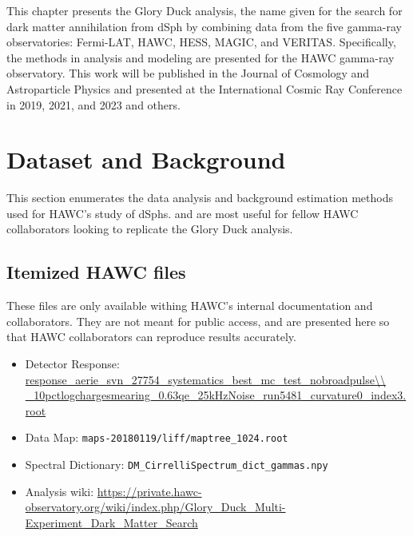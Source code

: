 This chapter presents the Glory Duck analysis, the name given for the search for dark matter annihilation from dSph by combining data from the five gamma-ray observatories: Fermi-LAT, HAWC, HESS, MAGIC, and VERITAS.
Specifically, the methods in analysis and modeling are presented for the HAWC gamma-ray observatory.
This work will be published in the Journal of Cosmology and Astroparticle Physics and presented at the International Cosmic Ray Conference in 2019, 2021, and 2023 \cite{glory_duck:ICRC2019,glory_duck:ICRC2021,glory_duck:ICRC2023} and others.

\section{Dataset and Background}\label{sec:gd_databgd}

This section enumerates the data analysis and background estimation methods used for HAWC's study of dSphs.
 and  are most useful for fellow HAWC collaborators looking to replicate the Glory Duck analysis.

\subsection{Itemized HAWC files}\label{sec:gd_data}
These files are only available withing HAWC's internal documentation and collaborators.
They are not meant for public access, and are presented here so that HAWC collaborators can reproduce results accurately.

\begin{itemize}
    \item Detector Response: \url{response\_aerie\_svn\_27754\_systematics\_best\_mc\_test\_nobroadpulse\\
    \_10pctlogchargesmearing\_0.63qe\_25kHzNoise\_run5481\_curvature0\_index3.root}
    \item Data Map: \texttt{maps-20180119/liff/maptree\_1024.root}
    \item Spectral Dictionary: \texttt{DM\_CirrelliSpectrum\_dict\_gammas.npy}
    \item Analysis wiki: \url{https://private.hawc-observatory.org/wiki/index.php/Glory_Duck_Multi-Experiment_Dark_Matter_Search}
\end{itemize}

